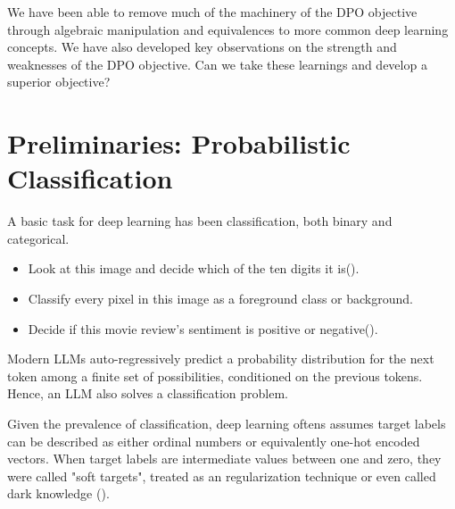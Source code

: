 \documentclass[twoside,11pt]{article}
\begin{document}
We have been able to remove much of the machinery of the DPO objective 
through algebraic manipulation and equivalences to more common
deep learning concepts.
We have also developed key observations on the strength and weaknesses
of the DPO objective. Can we take these learnings 
and develop a superior objective? 

\section{Preliminaries: Probabilistic Classification}

A basic task for deep learning has been classification, both
binary and categorical. 
\begin{itemize}
\item Look at this image and decide which  of the ten digits it is(\cite{lecun1998mnist}).
\item Classify every pixel in this image as a foreground class or background. 
\item Decide if this movie review's sentiment is positive or
negative(\cite{Pang+Lee:04a}).
\end{itemize}

Modern LLMs auto-regressively predict a probability distribution for 
the next token among a finite set of possibilities, conditioned on the 
previous tokens. Hence, an LLM also solves 
a classification problem. 

Given the prevalence of classification, deep learning oftens assumes
target labels can be described as either ordinal numbers
or equivalently one-hot encoded vectors. When target labels are
intermediate values between one and zero, they were called "soft targets", 
treated as an regularization technique or even called dark knowledge
(\cite{hinton2015distilling, szegedy2016rethinking,hinton2014dark}). 
\end{document}
